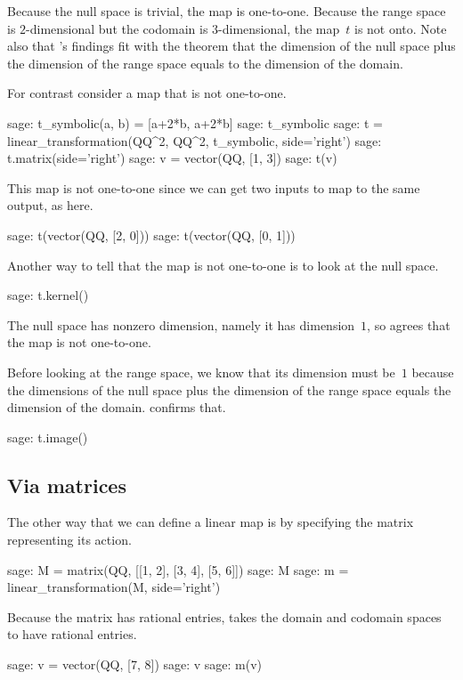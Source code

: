 Because the null space is trivial, the map is one-to-one. 
Because the range space is $2$-dimensional but 
the codomain is $3$-dimensional, the map~$t$ is not onto.
Note also that \Sage's findings fit with the theorem that
the dimension of the null space plus the dimension of the 
range space equals to the dimension of the domain.

For contrast consider a map that is not one-to-one.
\begin{sagecommandline}
sage: t_symbolic(a, b) = [a+2*b, a+2*b]
sage: t_symbolic
sage: t = linear_transformation(QQ^2, QQ^2, t_symbolic, side='right')
sage: t.matrix(side='right')
sage: v = vector(QQ, [1, 3])  
sage: t(v)
\end{sagecommandline}
This map is not one-to-one since we can get two inputs
to map to the same output, 
as here.  
\begin{sagecommandline}
sage: t(vector(QQ, [2, 0]))
sage: t(vector(QQ, [0, 1]))
\end{sagecommandline}
\noindent
Another way to tell that the map is not one-to-one is to look at the 
null space.
\begin{sagecommandline}
sage: t.kernel()
\end{sagecommandline}
The null space has nonzero dimension, namely it 
has dimension~$1$,
so \Sage{} agrees that the map is not one-to-one.

Before looking at the range space, we know that its dimension must be~$1$ 
because the dimensions of the null space plus the dimension of the 
range space equals the dimension of the domain.
\Sage{} confirms that.
\begin{sagecommandline}
sage: t.image()
\end{sagecommandline}



\subsection{Via matrices}
The other way that we can define a linear map is by specifying 
the matrix representing its action.
\begin{sagecommandline}
sage: M = matrix(QQ, [[1, 2], [3, 4], [5, 6]])
sage: M
sage: m = linear_transformation(M, side='right')
\end{sagecommandline}
Because the matrix has rational entries, \Sage{} takes the
domain and codomain spaces to have rational entries.
\begin{sagecommandline}
sage: v = vector(QQ, [7, 8])
sage: v
sage: m(v)  
\end{sagecommandline}

